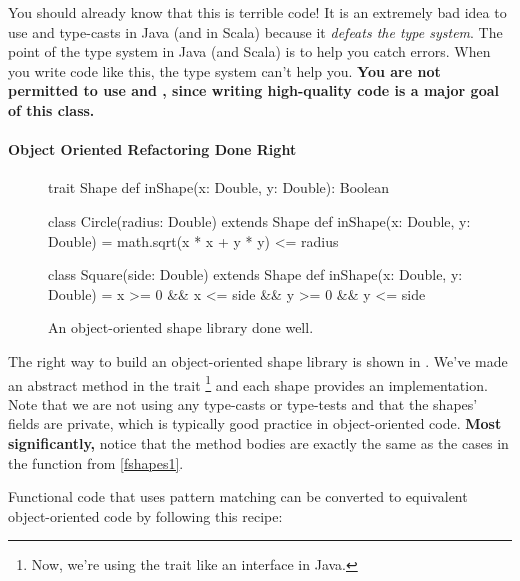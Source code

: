 \documentclass{book}
\begin{document}
You should already know that this is terrible code! It is an extremely bad idea
to use  and type-casts in Java (and in Scala) because it
\emph{defeats the type system}. The point of the type system in Java (and Scala)
is to help you catch errors. When you write code like this, the type system
can't help you.
\textbf{You are not permitted to use  and ,
since writing high-quality code is a major goal of this class.}

\paragraph{Object Oriented Refactoring Done Right}

\begin{figure}
\begin{scalacode}
trait Shape {
  def inShape(x: Double, y: Double): Boolean
}

class Circle(radius: Double) extends Shape {
   def inShape(x: Double, y: Double) = math.sqrt(x * x + y * y) <= radius
}

class Square(side: Double) extends Shape {
  def inShape(x: Double, y: Double) = x >= 0 && x <= side && y >= 0 && y <= side
}
\end{scalacode}
\caption{An object-oriented shape library done well.}
\label{jshapes1}
\end{figure}

The right way to build an object-oriented shape library is shown in .
We've made
 an abstract method in the trait
\footnote{Now, we're using the trait like an interface
in Java.} and each shape provides
an implementation. Note that we are not using any type-casts or type-tests and
that the shapes' fields are private, which is typically good practice in
object-oriented code. \textbf{Most significantly,} notice that the method
bodies are exactly the same as the cases in the function from \cref{fshapes1}.

Functional code that uses pattern matching can be converted to equivalent
object-oriented code by following this recipe:
\end{document}
